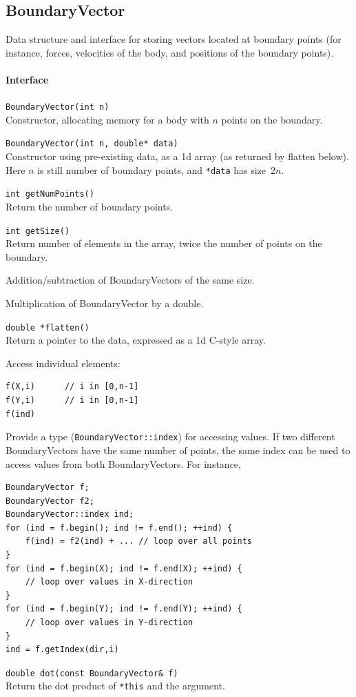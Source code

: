 \documentclass[11pt]{article}
\def\fn#1{{\ttfamily\small #1}} %
\let\code\lstinline
\begin{document}
\subsection{BoundaryVector}
Data structure and interface for storing vectors located at boundary points (for instance, forces, velocities of the body, and positions of the boundary points).

\paragraph{Interface}
\begin{description}
	\item \code|BoundaryVector(int n)| \\
	Constructor, allocating memory for a body with $n$ points on the boundary.
	\item \code|BoundaryVector(int n, double* data)| \\
	Constructor using pre-existing data, as a 1d array (as returned by \fn{flatten} below).  Here $n$ is still number of boundary points, and \code|*data| has size~$2n$.
	\item \code|int getNumPoints()|\\
	Return the number of boundary points.
	\item \code|int getSize()| \\
	Return number of elements in the array, twice the number of points on the boundary.
	\item Addition/subtraction of BoundaryVectors of the same size.
	\item Multiplication of BoundaryVector by a double.
	\item \code|double *flatten()|\\
	Return a pointer to the data, expressed as a 1d C-style array.
	\item Access individual elements:
\begin{lstlisting}
f(X,i)		// i in [0,n-1]
f(Y,i)		// i in [0,n-1]
f(ind)
\end{lstlisting}
	\item Provide a type (\code|BoundaryVector::index|) for accessing values.  If two different BoundaryVectors have the same number of points, the same index can be used to access values from both BoundaryVectors.  For instance,
	\begin{lstlisting}
BoundaryVector f;
BoundaryVector f2;
BoundaryVector::index ind;
for (ind = f.begin(); ind != f.end(); ++ind) {
	f(ind) = f2(ind) + ... // loop over all points
}
for (ind = f.begin(X); ind != f.end(X); ++ind) {
	// loop over values in X-direction
}
for (ind = f.begin(Y); ind != f.end(Y); ++ind) {
	// loop over values in Y-direction
}
ind = f.getIndex(dir,i)
	\end{lstlisting}

	\item \code|double dot(const BoundaryVector& f)|\\
	Return the dot product of \code|*this| and the argument.
	
\end{description}
\end{document}
